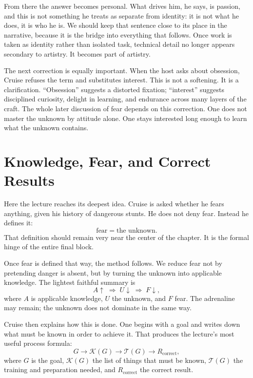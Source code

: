 From there the answer becomes personal. What drives him, he says, is passion, and this is not something he treats as separate from identity: it is not what he does, it is who he is. We should keep that sentence close to its place in the narrative, because it is the bridge into everything that follows. Once work is taken as identity rather than isolated task, technical detail no longer appears secondary to artistry. It becomes part of artistry.

The next correction is equally important. When the host asks about obsession, Cruise refuses the term and substitutes interest. This is not a softening. It is a clarification. ``Obsession'' suggests a distorted fixation; ``interest'' suggests disciplined curiosity, delight in learning, and endurance across many layers of the craft. The whole later discussion of fear depends on this correction. One does not master the unknown by attitude alone. One stays interested long enough to learn what the unknown contains.

\section{Knowledge, Fear, and Correct Results}

Here the lecture reaches its deepest idea. Cruise is asked whether he fears anything, given his history of dangerous stunts. He does not deny fear. Instead he defines it:
\begin{equation}
\text{fear}=\text{the unknown}.
\end{equation}
That definition should remain very near the center of the chapter. It is the formal hinge of the entire final block.

Once fear is defined that way, the method follows. We reduce fear not by pretending danger is absent, but by turning the unknown into applicable knowledge. The lightest faithful summary is
\begin{equation}
A\uparrow \;\Longrightarrow\; U\downarrow \;\Longrightarrow\; F\downarrow,
\end{equation}
where \(A\) is applicable knowledge, \(U\) the unknown, and \(F\) fear. The adrenaline may remain; the unknown does not dominate in the same way.

Cruise then explains how this is done. One begins with a goal and writes down what must be known in order to achieve it. That produces the lecture's most useful process formula:
\begin{equation}
G \longrightarrow \mathcal{K}(G) \longrightarrow \mathcal{T}(G) \longrightarrow R_{\mathrm{correct}},
\end{equation}
where \(G\) is the goal, \(\mathcal{K}(G)\) the list of things that must be known, \(\mathcal{T}(G)\) the training and preparation needed, and \(R_{\mathrm{correct}}\) the correct result.

